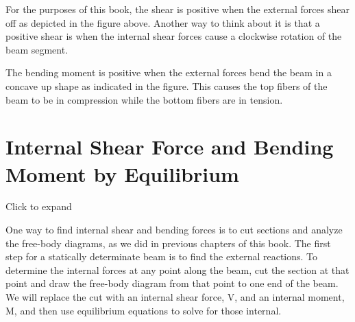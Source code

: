 \documentclass[
  letterpaper,
  DIV=11,
  numbers=noendperiod]{scrreprt}
\begin{document}
For the purposes of this book, the shear is positive when the external
forces shear off as depicted in the figure above. Another way to think
about it is that a positive shear is when the internal shear forces
cause a clockwise rotation of the beam segment.

The bending moment is positive when the external forces bend the beam in
a concave up shape as indicated in the figure. This causes the top
fibers of the beam to be in compression while the bottom fibers are in
tension.

\section{Internal Shear Force and Bending Moment by
Equilibrium}\label{internal-shear-force-and-bending-moment-by-equilibrium}

Click to expand

One way to find internal shear and bending forces is to cut sections and
analyze the free-body diagrams, as we did in previous chapters of this
book. The first step for a statically determinate beam is to find the
external reactions. To determine the internal forces at any point along
the beam, cut the section at that point and draw the free-body diagram
from that point to one end of the beam. We will replace the cut with an
internal shear force, V, and an internal moment, M, and then use
equilibrium equations to solve for those internal.
\end{document}
